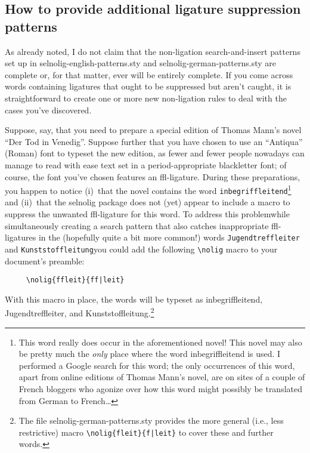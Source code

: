 \documentclass[11pt]{article}
\newcommand{\pkg}[1]{\textsf{#1}}
\newcommand{\opt}[1]{\texttt{#1}}
\begin{document}
\subsection{How to provide additional ligature suppression patterns}

As already noted, I do not claim that the non-ligation search-and-insert patterns set up in \pkg{selnolig-english-patterns.sty} and \pkg{selnolig-german-patterns.sty} are complete or, for that matter, ever will be entirely complete. If you come across words containing ligatures that ought to be suppressed but aren't caught, it is straightforward to create one or more new non-ligation rules to deal with the cases you've discovered.

Suppose, say, that you need to prepare a special edition of Thomas Mann's novel \enquote{Der Tod in Venedig}. Suppose further that you have chosen to use an \enquote{Antiqua} (Roman) font to typeset the new edition, as fewer and fewer people nowadays can manage to read with ease text set in a period-appropriate {\blackletterfont blackletter} font; of course, the font you've chosen features an ffl-ligature. During these preparations, you happen to notice (i)~that the novel contains the word \opt{inbegriffleitend}\footnote{This word really does occur in the aforementioned novel! This novel may also be pretty much the \emph{only} place where the word inbegriffleitend is used. I performed a Google search for this word; the only occurrences of this word, apart from online editions of Thomas Mann's novel, are on sites of a couple of French bloggers who agonize over how this word might possibly be translated from German to French\dots} and (ii)~that the \pkg{selnolig} package does not (yet) appear to include a macro to suppress the unwanted ffl-ligature for this word. To address this problem\textemdash while simultaneously creating a search pattern that also catches inappropriate ffl-ligatures in the (hopefully quite a bit more common!) words \opt{Jugendtreffleiter} and \opt{Kunststoffleitung}\textemdash you could add the following \Verb+\nolig+ macro to your document's preamble:
\begin{Verbatim}
     \nolig{ffleit}{ff|leit}
\end{Verbatim}
With this macro in place, the words will be typeset as inbegriffleitend, Jugendtreffleiter, and Kunststoffleitung.\footnote{The file \pkg{selnolig-german-patterns.sty} provides the more general (i.e., less restrictive) macro \Verb+\nolig{fleit}{f|leit}+ to cover these and further words.} 
\end{document}
